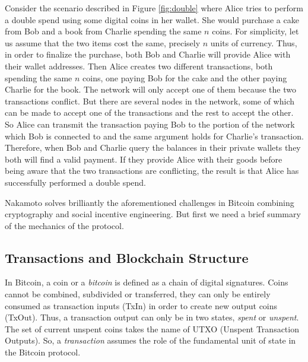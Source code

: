 \bigskip
\noindent
Consider the scenario described in Figure \ref{fig:double} where Alice tries to perform a double spend using some digital coins in her wallet. She would purchase a cake from Bob and a book from Charlie spending the same $n$ coins. For simplicity, let us assume that the two items cost the same, precisely $n$ units of currency. Thus, in order to finalize the purchase, both Bob and Charlie will provide Alice with their wallet addresses. Then Alice creates two different transactions, both spending the same $n$ coins, one paying Bob for the cake and the other paying Charlie for the book. The network will only accept one of them because the two transactions conflict. But there are several nodes in the network, some of which can be made to accept one of the transactions and the rest to accept the other. So Alice can transmit the transaction paying Bob to the portion of the network which Bob is connected to and the same argument holds for Charlie's transaction. Therefore, when Bob and Charlie query the balances in their private wallets they both will find a valid payment. If they provide Alice with their goods before being aware that the two transactions are conflicting, the result is that Alice has successfully performed a double spend.

\bigskip
\noindent
Nakamoto solves brilliantly the aforementioned challenges in Bitcoin combining cryptography and social incentive engineering. But first we need a brief summary of the mechanics of the protocol.

\bigskip
\subsection{Transactions and Blockchain Structure}
\label{sec:transaction-blockchain}
In Bitcoin, a coin or a \textit{bitcoin} is defined as a chain of digital signatures. Coins cannot be combined, subdivided or transferred, they can only be entirely consumed as transaction inputs (TxIn) in order to create new output coins (TxOut). Thus, a transaction output can only be in two states, \textit{spent} or \textit{unspent}. The set of current unspent coins takes the name of UTXO (Unspent Transaction Outputs). So, a \textit{transaction} assumes the role of the fundamental unit of state in the Bitcoin protocol.

